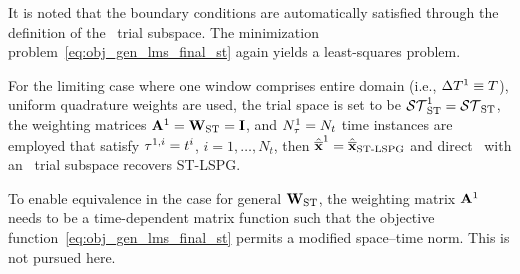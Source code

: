 It is noted that the boundary conditions are automatically satisfied through the definition of the \spaceTimeAcronym\ trial subspace. The minimization problem~\eqref{eq:obj_gen_lms_final_st} again yields a least-squares problem.
\begin{remark}
For the limiting case where one window comprises entire domain (i.e., $\Delta T^{1}\equiv T$), uniform quadrature weights are used, the trial space is set to be $\mathcal{ ST }_{\text{ST}}^{1} = \mathcal{ ST }_{\text{ST}}$, the weighting matrices $\mathbf{A}^{1} = \mathbf{W}_{\text{ST}} = \mathbf{I}$, and $N_{\tau}^{1} = N_t$ time instances are employed that satisfy $\tau^{1,i} = t^i$, $i=1,\ldots,N_t$, then $\hat{\mathbf{\overline{x}}}^{1} =  \hat{\mathbf{\overline{x}}}_\text{ST-LSPG}$ and direct \methodAcronym\ with an \spaceTimeAcronym\ trial subspace recovers ST-LSPG. 
\end{remark}

\begin{remark}
To enable equivalence in the case for general $\mathbf{W}_{\text{ST}}$, the weighting matrix $\mathbf{A}^{1}$ needs to be a time-dependent matrix function such that the objective function~\eqref{eq:obj_gen_lms_final_st} permits a modified space--time norm. This is not pursued here.
\end{remark}
 
